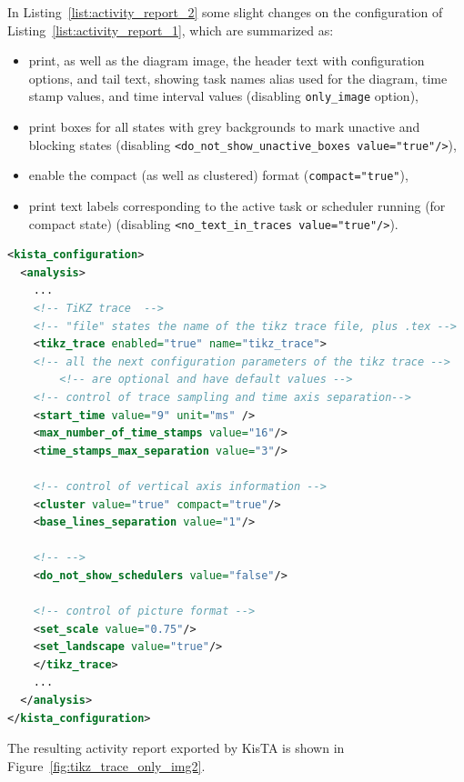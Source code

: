In Listing~\ref{list:activity_report_2} some slight changes on the configuration of Listing~\ref{list:activity_report_1},
which are summarized as:
\begin{itemize}
\item print, as well as the diagram image, the header text with configuration options, and tail text, showing task names alias used for the diagram, time stamp values,
and time interval values (disabling \texttt{only\_image} option),
\item print boxes for all states with grey backgrounds to mark unactive and blocking states (disabling \texttt{<do\_not\_show\_unactive\_boxes value="true"/>}),
\item enable the compact (as well as clustered) format (\texttt{compact="true"}),
\item print text labels corresponding to the active task or scheduler running (for compact state) (disabling \texttt{<no\_text\_in\_traces value="true"/>}).
\end{itemize}
 
\begin{table}[htbp]
\begin{lstlisting}[language=XML, caption={Example of configuration of an activity report from the XML interface for the VAD example.}, label=list:activity_report_2]
<kista_configuration>
  <analysis>
    ...
    <!-- TiKZ trace  -->
    <!-- "file" states the name of the tikz trace file, plus .tex -->
    <tikz_trace enabled="true" name="tikz_trace">
	<!-- all the next configuration parameters of the tikz trace -->
        <!-- are optional and have default values -->
	<!-- control of trace sampling and time axis separation-->
	<start_time value="9" unit="ms" />
	<max_number_of_time_stamps value="16"/>
	<time_stamps_max_separation value="3"/>

	<!-- control of vertical axis information -->
	<cluster value="true" compact="true"/>
	<base_lines_separation value="1"/>

	<!-- -->
	<do_not_show_schedulers value="false"/>	
			
	<!-- control of picture format -->
	<set_scale value="0.75"/>
	<set_landscape value="true"/>
    </tikz_trace>
    ...
  </analysis>
</kista_configuration>
\end{lstlisting}
\end{table}

The resulting activity report exported by KisTA is shown in Figure~\ref{fig:tikz_trace_only_img2}.

